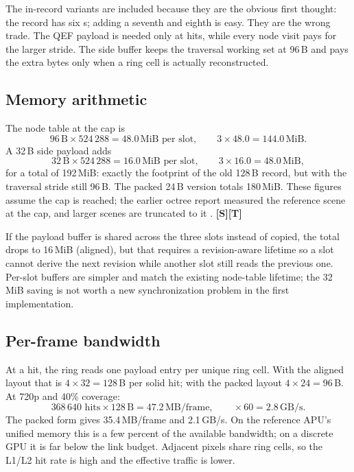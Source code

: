 \documentclass[11pt,a4paper]{article}
\newcommand{\evS}{\textsf{\textbf{\color{evS}[S]}}}
\newcommand{\evT}{\textsf{\textbf{\color{evT}[T]}}}
\newcommand{\code}[1]{\texttt{\detokenize{#1}}}
\theoremstyle{plain}
\theoremstyle{definition}
\theoremstyle{remark}
\begin{document}
The in-record variants are included because they are the obvious first
thought: the record has six \code{vec4}s; adding a seventh and eighth is easy.
They are the wrong trade. The QEF payload is needed only at hits, while every
node visit pays for the larger stride. The side buffer keeps the traversal
working set at 96\,B and pays the extra bytes only when a ring cell is
actually reconstructed.

\subsection{Memory arithmetic}

The node table at the cap is
\begin{equation}
96\,\text{B}\times 524\,288 = 48.0\,\text{MiB per slot},\qquad
3\times 48.0 = 144.0\,\text{MiB}.
\end{equation}
A 32\,B side payload adds
\begin{equation}
32\,\text{B}\times 524\,288 = 16.0\,\text{MiB per slot},\qquad
3\times 16.0 = 48.0\,\text{MiB},
\end{equation}
for a total of 192\,MiB: exactly the footprint of the old 128\,B record, but
with the traversal stride still 96\,B. The packed 24\,B version totals
180\,MiB. These figures assume the cap is reached; the earlier octree report
measured the reference scene at the cap, and larger scenes are truncated to
it \cite{raymarchReport}. \evS\evT

If the payload buffer is shared across the three slots instead of copied, the
total drops to 16\,MiB (aligned), but that requires a revision-aware lifetime
so a slot cannot derive the next revision while another slot still reads the
previous one. Per-slot buffers are simpler and match the existing node-table
lifetime; the 32\,MiB saving is not worth a new synchronization problem in the
first implementation.

\subsection{Per-frame bandwidth}

At a hit, the ring reads one payload entry per unique ring cell. With the
aligned layout that is $4\times32=128$\,B per solid hit; with the packed
layout $4\times24=96$\,B. At 720p and 40\% coverage:
\begin{equation}
368\,640\text{ hits}\times128\,\text{B}=47.2\,\text{MB/frame},\qquad
\times60=2.8\,\text{GB/s}.
\end{equation}
The packed form gives 35.4\,MB/frame and 2.1\,GB/s. On the reference APU's
unified memory this is a few percent of the available bandwidth; on a
discrete GPU it is far below the link budget. Adjacent pixels share ring
cells, so the L1/L2 hit rate is high and the effective traffic is lower.
\end{document}
